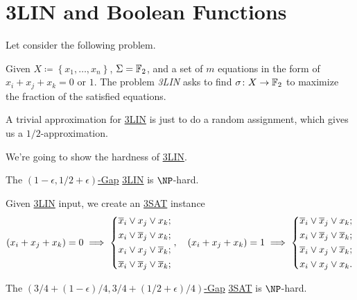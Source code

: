\section{3LIN and Boolean Functions}
Let consider the following problem.
\begin{problem}[3LIN]\label{prb:3LIN}
Given \(X\coloneqq \left\{ x_1, \ldots , x_n  \right\} \), \(\Sigma = \mathbb{\MakeUppercase{f}} _2\), and a set of \(m\) equations in the form of \(x_i + x_j + x_k = 0\) or \(1\). The problem \emph{3LIN} asks to find \(\sigma \colon X\to \mathbb{\MakeUppercase{f}} _2\) to maximize the fraction of the satisfied equations.
\end{problem}

\begin{remark}
	A trivial approximation for \hyperref[prb:3LIN]{3LIN} is just to do a random assignment, which gives us a \(1 / 2\)-approximation.
\end{remark}

We're going to show the hardness of \hyperref[prb:3LIN]{3LIN}.

\begin{theorem}[\cite{10.1145/258533.258536}]
	The \hyperref[def:c-s-Gap]{\((1 - \epsilon , 1 / 2 + \epsilon )\)-Gap} \hyperref[prb:3LIN]{3LIN} is \(\NP\)-hard.
\end{theorem}

Given \hyperref[prb:3LIN]{3LIN} input, we create an \hyperref[prb:max-3SAT]{3SAT} instance
\[
	(x_i + x_j + x_k) = 0 \implies \begin{dcases}
		\overline{x} _i \lor x_j \lor x_k;   \\
		x _i \lor \overline{x} _j \lor x_k;  \\
		x _i \lor x _j \lor \overline{x} _k; \\
		\overline{x} _i \lor \overline{x} _j \lor \overline{x} _k;
	\end{dcases},\quad
	(x_i + x_j + x_k) = 1 \implies \begin{dcases}
		\overline{x} _i \lor \overline{x} _j \lor x_k;   \\
		x _i \lor \overline{x} _j \lor \overline{x} _k;  \\
		\overline{x}  _i \lor x _j \lor \overline{x} _k; \\
		x_i \lor x _j \lor x _k.
	\end{dcases}
\]

\begin{corollary}
	The \hyperref[def:c-s-Gap]{\((3 / 4 + (1 - \epsilon ) / 4, 3 / 4 + (1 / 2 + \epsilon ) / 4)\)-Gap} \hyperref[prb:max-3SAT]{3SAT} is \(\NP\)-hard.
\end{corollary}

